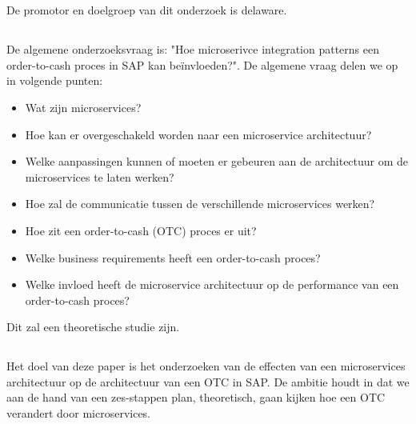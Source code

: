 
\chapter{}
\label{ch:inleiding}

\section{}
\label{sec:probleemstelling}
De promotor en doelgroep van dit onderzoek is delaware.

\section{}
\label{sec:onderzoeksvraag}
De algemene onderzoeksvraag is: "Hoe microserivce integration patterns een order-to-cash proces in SAP kan beïnvloeden?". De algemene vraag delen we op in volgende punten:
\begin{itemize}
  \item Wat zijn microservices?
  \item Hoe kan er overgeschakeld worden naar een microservice architectuur?
  \item Welke aanpassingen kunnen of moeten er gebeuren aan de architectuur om de microservices te laten werken?
  \item Hoe zal de communicatie tussen de verschillende microservices werken?
  \item Hoe zit een order-to-cash (OTC) proces er uit?
  \item Welke business requirements heeft een order-to-cash proces?
  \item Welke invloed heeft de microservice architectuur op de performance van een order-to-cash proces?
\end{itemize}
Dit zal een theoretische studie zijn.

\section{}
\label{sec:onderzoeksdoelstelling}
Het doel van deze paper is het onderzoeken van de effecten van een microservices architectuur op de architectuur van een OTC in SAP. De ambitie houdt in dat we aan de hand van een zes-stappen plan, theoretisch, gaan kijken hoe een OTC verandert door microservices.  

